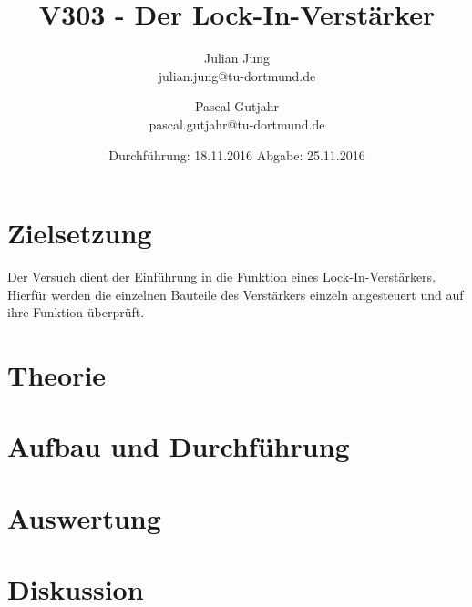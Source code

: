 

\title{V303 - Der Lock-In-Verstärker}
\author{Julian Jung \\ julian.jung@tu-dortmund.de
  \and Pascal Gutjahr \\ pascal.gutjahr@tu-dortmund.de}
  \date{Durchführung: 18.11.2016
  \hspace{3em}
  Abgabe: 25.11.2016}
  
\maketitle
\newpage
\tableofcontents
\newpage
\section{Zielsetzung}
Der Versuch dient der Einführung in die Funktion eines Lock-In-Verstärkers.
Hierfür werden die einzelnen Bauteile des Verstärkers einzeln angesteuert und
auf ihre Funktion überprüft.
\section{Theorie}

\section{Aufbau und Durchführung}

\section{Auswertung}
% 
\section{Diskussion}
% 
\printbibliography %
 
